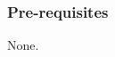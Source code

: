 \maketitle
{\small
    \setlength{\parindent}{0em}
    \setlength{\parskip}{1em}
    \subsubsection*{Pre-requisites}
    None.
}